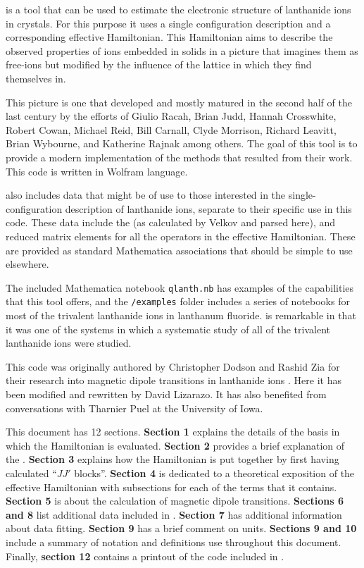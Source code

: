 \documentclass{article}
\newcommand{\codetext}[1]{{\color{BlueViolet} \texttt{#1}}}
\begin{document}
\qlanth is a tool that can be used to estimate the electronic structure of lanthanide ions in crystals. For this purpose it uses a single configuration description and a corresponding effective Hamiltonian. This Hamiltonian aims to describe the observed properties of ions embedded in solids in a picture that imagines them as free-ions but modified by the influence of the lattice in which they find themselves in.

This picture is one that developed and mostly matured in the second half of the last century by the efforts of Giulio Racah, Brian Judd, Hannah Crosswhite, Robert Cowan, Michael Reid, Bill Carnall, Clyde Morrison, Richard Leavitt, Brian Wybourne, and Katherine Rajnak among others. The goal of this tool is to provide a modern implementation of the methods that resulted from their work. This code is written in Wolfram language.

\qlanth also includes data that might be of use to those interested in the single-configuration description of lanthanide ions, separate to their specific use in this code. These data include the \cfps (as calculated by Velkov and parsed here), and reduced matrix elements for all the operators in the effective Hamiltonian. These are provided as standard Mathematica associations that should be simple to use elsewhere.

The included Mathematica notebook \codetext{qlanth.nb} has examples of the capabilities that this tool offers, and the \codetext{/examples} folder includes a series of notebooks for most of the trivalent lanthanide ions in lanthanum fluoride. \LaFthree is remarkable in that it was one of the systems in which a systematic study \cite{carnall_systematic_1989} of all of the trivalent lanthanide ions were studied. 

This code was originally authored by Christopher Dodson and Rashid Zia for their research into magnetic dipole transitions in lanthanide ions \cite{dodson_magnetic_2012}. Here it has been modified and rewritten by David Lizarazo. It has also benefited from conversations with Tharnier Puel at the University of Iowa.

This document has 12 sections. \textbf{Section 1} explains the details of the basis in which the Hamiltonian is evaluated. \textbf{Section 2} provides a brief explanation of the \cfps. \textbf{Section 3} explains how the Hamiltonian is put together by first having calculated ``$JJ'$ blocks''. \textbf{Section 4} is dedicated to a theoretical exposition of the effective Hamiltonian with subsections for each of the terms that it contains. \textbf{Section 5} is about the calculation of magnetic dipole transitions. \textbf{Sections 6 and 8} list additional data included in \qlanth. \textbf{Section 7} has additional information about data fitting.  \textbf{Section 9} has a brief comment on units. \textbf{Sections 9 and 10} include a summary of notation and definitions use throughout this document. Finally, \textbf{section 12} contains a printout of the code included in \qlanth.
\end{document}
